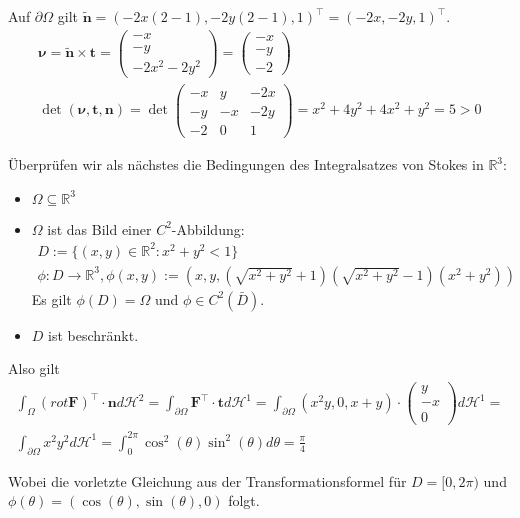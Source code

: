 \documentclass[]{article}
\begin{document}
Auf $\partial\Omega$ gilt $\tilde{\bm{n}}=(-2x(2-1), -2y(2-1), 1)^\top = (-2x, -2y, 1)^\top$.
\begin{align*}
	\bm{\nu} = \tilde{\bm{n}} \times \bm{t} = \begin{pmatrix} -x\\ -y\\ -2x^2-2y^2 \end{pmatrix} = \begin{pmatrix} -x\\ -y\\ -2 \end{pmatrix}\\
	\det(\bm{\nu}, \bm{t}, \bm{n}) = \det\begin{pmatrix}
		-x & y & -2x\\
		-y & -x  & -2y\\
		-2 & 0  & 1
	\end{pmatrix} = x^2+4y^2+4x^2+y^2 = 5 > 0
\end{align*}

Überprüfen wir als nächstes die Bedingungen des Integralsatzes von Stokes in $\mathbb{R}^3$:

\begin{itemize}
	\item $\Omega \subseteq \mathbb{R}^3$
	\item $\Omega$ ist das Bild einer $C^2$-Abbildung:
	\begin{align*}
		D := \{(x,y)\in\mathbb{R}^2: x^2+y^2 < 1\}\\
		\phi: D \rightarrow \mathbb{R}^3, \phi(x, y) := (x, y, (\sqrt{x^2+y^2}+1)(\sqrt{x^2+y^2}-1)(x^2+y^2))
	\end{align*}
	Es gilt $\phi(D)=\Omega$ und $\phi \in C^2(\bar{D})$.
	\item $D$ ist beschränkt.
\end{itemize}

Also gilt
\begin{align*}
	\int_\Omega (rot\bm{F})^\top \cdot \bm{n} d\mathcal{H}^2 = \int_{\partial\Omega} \bm{F}^\top \cdot \bm{t} d\mathcal{H}^1 = \int_{\partial\Omega} (x^2y, 0, x+y) \cdot \begin{pmatrix} y\\ -x\\ 0 \end{pmatrix} d\mathcal{H}^1 =\\
	\int_{\partial\Omega} x^2y^2 d\mathcal{H}^1 = \int_{0}^{2\pi} \cos^2(\theta) \sin^2(\theta) d\theta = \frac{\pi}{4}
\end{align*}

Wobei die vorletzte Gleichung aus der Transformationsformel für $D=[0,2\pi)$ und $\phi(\theta)=(\cos(\theta), \sin(\theta), 0)$ folgt.
\end{document}
